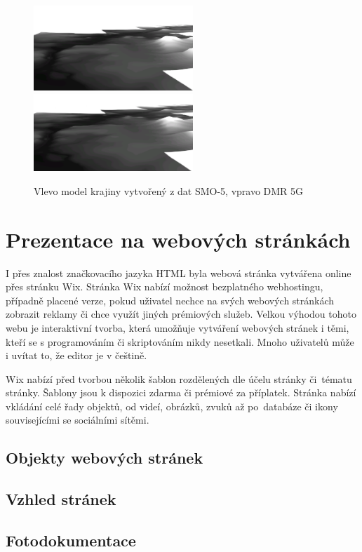 \documentclass[thesis=M,czech]{FITthesis}[2012/06/26]
\begin{document}
\begin{figure}[htp]
\centering
\includegraphics[width=6cm]{pics/dm_smo5.png}
\includegraphics[width=6cm]{pics/dmr_5g.png}
\caption{Vlevo model krajiny vytvořený z dat SMO-5, vpravo DMR 5G}
\label{obrazek:rozdilvysek}
\end{figure}


\chapter{Prezentace na webových stránkách}
I přes znalost značkovacího jazyka HTML byla webová stránka vytvářena online přes stránku Wix. Stránka Wix nabízí možnost bezplatného webhostingu, případně placené verze, pokud uživatel nechce na svých webových stránkách zobrazit reklamy či chce využít jiných prémiových služeb. Velkou výhodou tohoto webu je interaktivní tvorba, která umožňuje vytváření webových stránek i těmi, kteří se s programováním či skriptováním nikdy nesetkali. Mnoho uživatelů může i uvítat to, že editor je v češtině. 

Wix nabízí před tvorbou několik šablon rozdělených dle účelu stránky či~tématu stránky. Šablony jsou k dispozici zdarma či prémiové za příplatek. Stránka nabízí vkládání celé řady objektů, od videí, obrázků, zvuků až po~databáze či ikony souvisejícími se sociálními sítěmi. 




\section{Objekty webových stránek}


\section{Vzhled stránek}


\section{Fotodokumentace}
\end{document}
